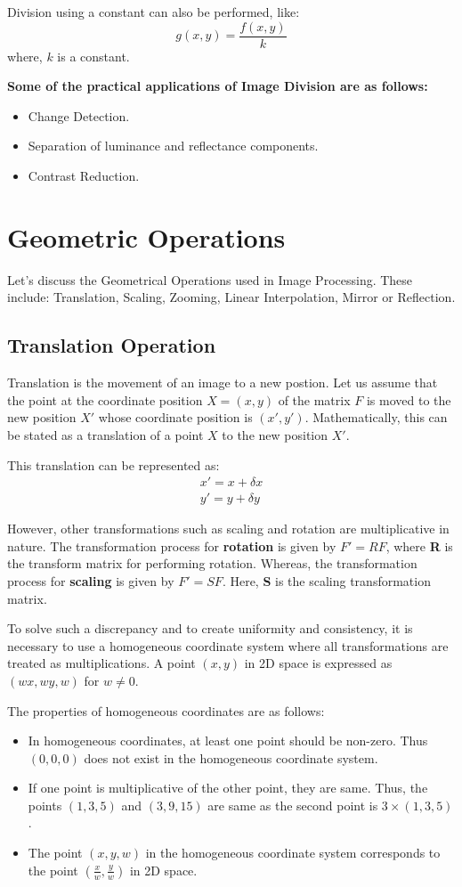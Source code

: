 Division using a constant can also be performed, like:
$$g(x,y) = \frac{f(x,y)}{k}$$
where, $k$ is a constant.

\textbf{Some of the practical applications of Image Division are as follows:}
\begin{itemize}
    \item Change Detection.
    \item Separation of luminance and reflectance components.
    \item Contrast Reduction.
\end{itemize}

\section{Geometric Operations}
Let's discuss the Geometrical Operations used in Image Processing. These include: Translation, Scaling, Zooming, Linear Interpolation, Mirror or Reflection.

\subsection{Translation Operation}

Translation is the movement of an image to a new postion.
Let us assume that the point at the coordinate position $X = (x,y)$ of the matrix $F$ is moved to the new position $X'$ whose coordinate position is $(x',y')$.
Mathematically, this can be stated as a translation of a point $X$ to the new position $X'$.

This translation can be represented as:
\begin{gather*}
    x' = x + \delta x\\
    y' = y + \delta y
\end{gather*}

However, other transformations such as scaling and rotation are multiplicative in nature.
The transformation process for \textbf{rotation} is given by \textbf{$F' = RF$}, where \textbf{R} is the transform matrix for performing rotation.
Whereas, the transformation process for \textbf{scaling} is given by \textbf{$F' = SF$}. Here, \textbf{S} is the scaling transformation matrix.

To solve such a discrepancy and to create uniformity and consistency, it is necessary to use a homogeneous coordinate system where all transformations are treated as multiplications.
A point $(x,y)$ in 2D space is expressed as $(wx, wy, w)$ for $w \neq 0$.

The properties of homogeneous coordinates are as follows:
\begin{itemize}
    \item In homogeneous coordinates, at least one point should be non-zero. Thus $(0, 0, 0)$ does not exist in the homogeneous coordinate system.
    \item If one point is multiplicative of the other point, they are same. Thus, the points $(1, 3, 5)$ and $(3, 9, 15)$ are same as the second point is $3 \times (1, 3, 5)$.
    \item The point $(x, y, w)$ in the homogeneous coordinate system corresponds to the point $(\frac{x}{w}, \frac{y}{w})$ in 2D space.
\end{itemize}

